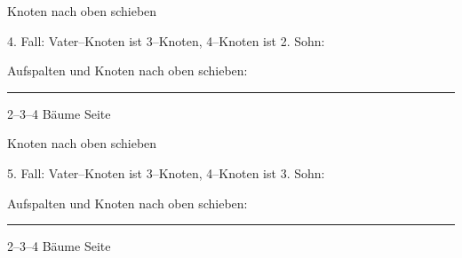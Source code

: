 \begin{slide}{}
\normalsize

\begin{center}
Knoten nach oben schieben 
\end{center}
\vspace*{0.5cm}

\footnotesize
4. Fall: Vater--Knoten ist 3--Knoten, 4--Knoten ist 2. Sohn:

\hspace*{1.3cm} 

Aufspalten und Knoten nach oben schieben:

\hspace*{1.3cm} 


\vspace*{\fill}
\tiny \addtocounter{mypage}{1}
\rule{17cm}{1mm}
2--3--4 B\"aume  \hspace*{\fill} Seite 
\end{slide}


\begin{slide}{}
\normalsize

\begin{center}
Knoten nach oben schieben 
\end{center}
\vspace*{0.5cm}

\footnotesize
5. Fall: Vater--Knoten ist 3--Knoten, 4--Knoten ist 3. Sohn:

\hspace*{1.3cm} 

Aufspalten und Knoten nach oben schieben:

\hspace*{1.3cm} 


\vspace*{\fill}
\tiny \addtocounter{mypage}{1}
\rule{17cm}{1mm}
2--3--4 B\"aume  \hspace*{\fill} Seite 
\end{slide}


